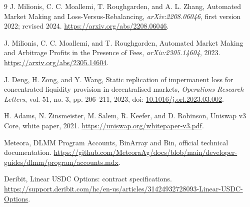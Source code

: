 \begin{thebibliography}{9}
J. Milionis, C. C. Moallemi, T. Roughgarden, and A. L. Zhang,
Automated Market Making and Loss-Versus-Rebalancing,
\emph{arXiv:2208.06046}, first version 2022; revised 2024.
\url{https://arxiv.org/abs/2208.06046}.

J. Milionis, C. C. Moallemi, and T. Roughgarden,
Automated Market Making and Arbitrage Profits in the Presence of Fees,
\emph{arXiv:2305.14604}, 2023.
\url{https://arxiv.org/abs/2305.14604}.

J. Deng, H. Zong, and Y. Wang,
Static replication of impermanent loss for concentrated liquidity provision in decentralised markets,
\emph{Operations Research Letters}, vol. 51, no. 3, pp. 206--211, 2023,
doi: \href{https://doi.org/10.1016/j.orl.2023.03.002}{10.1016/j.orl.2023.03.002}.

H. Adams, N. Zinsmeister, M. Salem, R. Keefer, and D. Robinson,
Uniswap v3 Core, white paper, 2021.
\url{https://uniswap.org/whitepaper-v3.pdf}.

Meteora, DLMM Program Accounts, BinArray and Bin, official technical documentation.
\url{https://github.com/MeteoraAg/docs/blob/main/developer-guides/dlmm/program/accounts.mdx}.

Deribit, Linear USDC Options: contract specifications.
\url{https://support.deribit.com/hc/en-us/articles/31424932728093-Linear-USDC-Options}.
\end{thebibliography}
